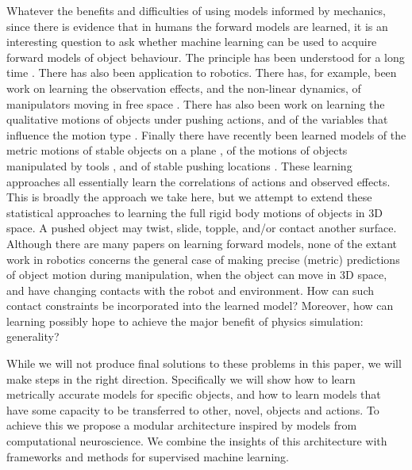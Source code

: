 Whatever the benefits and difficulties of using models informed by mechanics, since there is evidence that in humans the forward models are learned, it is an interesting question to ask whether machine learning can be used to acquire forward models of object behaviour. The principle has been understood for a long time \citep{JordanJacobs90,JordanRumelhart92}. There has also been application to robotics. There has, for example, been work on learning the observation effects, and the non-linear dynamics, of manipulators moving in free space \citep{Ting06,Boots14,dearden2005learning}. There has also been work on learning the qualitative motions of objects under pushing actions, and of the variables that influence the motion type \citep{montesano08,moldovan12,hermans11,fitzpatrick_learning_2003,ridge2010self,kroemer2014}. Finally there have recently been learned models of the metric motions of stable objects on a plane \citep{mericli2014}, of the motions of objects manipulated by tools \citep{Stoytchev_affordances_2008}, and of stable pushing locations \citep{hermans13}. These learning approaches all essentially learn the correlations of actions and observed effects. This is broadly the approach we take here, but we attempt to extend these statistical approaches to learning the full rigid body motions of objects in 3D space. A pushed object may twist, slide, topple, and/or contact another surface. Although there are many papers on learning forward models, none of the extant work in robotics concerns the general case of making precise (metric) predictions of object motion during manipulation, when the object can move in 3D space, and have changing contacts with the robot and environment. How can such contact constraints be incorporated into the learned model? Moreover, how can learning possibly hope to achieve the major benefit of physics simulation: generality? 

While we will not produce final solutions to these problems in this paper, we will make steps in the right direction. Specifically we will show how to learn metrically accurate models for specific objects, and how to learn models that have some capacity to be transferred to other, novel, objects and actions. To achieve this we propose a modular architecture inspired by models from computational neuroscience. We combine the insights of this architecture with frameworks and methods for supervised machine learning. 
